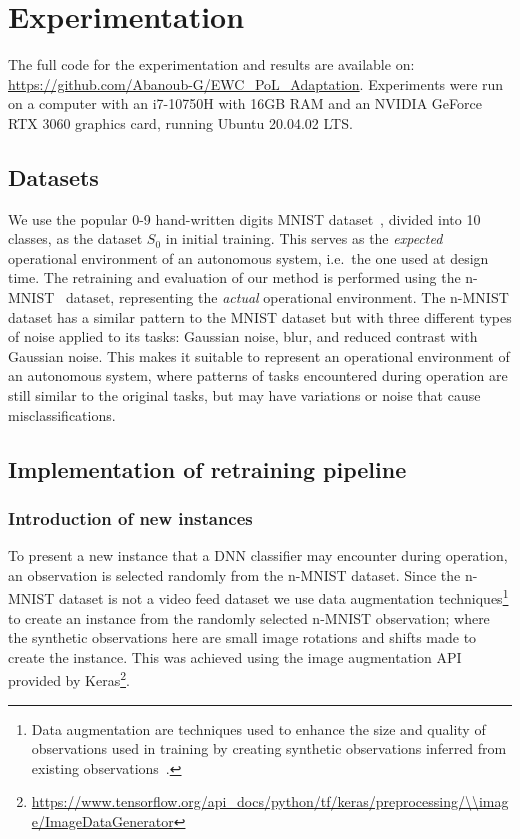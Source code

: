 \section{Experimentation}\label{sec:experimentation}
The full code for the experimentation and results are available on: \url{https://github.com/Abanoub-G/EWC_PoL_Adaptation}.
% 
Experiments were run on a computer with an i7-10750H with 16GB RAM and an NVIDIA GeForce RTX 3060 graphics card, running Ubuntu 20.04.02 LTS.
\subsection{Datasets}
We use the popular 0-9 hand-written digits MNIST dataset~\cite{deng2012mnist}, divided into 10 classes, as the dataset $S_0$ in initial training.
%
This serves as the \textit{expected} operational environment of an
autonomous system, i.e.\ the one used at design time.
%
The retraining and evaluation of our method is performed using the n-MNIST~\cite{Basu2017} dataset, representing the \textit{actual} operational environment. 
%
The n-MNIST dataset has a similar pattern to the MNIST dataset but with three different types of noise applied to its tasks: Gaussian noise, blur, and reduced contrast with Gaussian noise. 
%
This makes it suitable to represent an operational environment of an autonomous system, where patterns of tasks encountered during operation are still similar to the original tasks, but may have variations or noise that cause misclassifications.

\subsection{Implementation of retraining pipeline}
\subsubsection{Introduction of new instances}
To present a new instance that a DNN classifier may encounter during operation, an observation is selected randomly from the n-MNIST dataset.
%
Since the n-MNIST dataset is not a video feed dataset we use data augmentation techniques\footnote{Data augmentation are techniques used to enhance the size and quality of observations used in training by creating synthetic observations inferred from existing observations~\cite{Shorten2019}.} to create an instance from the randomly selected n-MNIST observation; where the synthetic observations here are small image rotations and shifts made to create the instance.
%
This was achieved using the image augmentation API provided by Keras\footnote{\url{https://www.tensorflow.org/api\_docs/python/tf/keras/preprocessing/\\image/ImageDataGenerator}}.  

